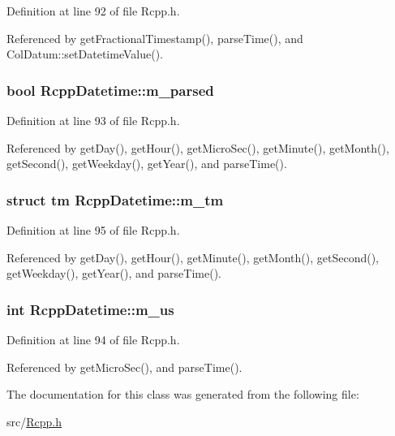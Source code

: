 Definition at line 92 of file Rcpp.h.

Referenced by getFractionalTimestamp(), parseTime(), and ColDatum::setDatetimeValue().\hypertarget{classRcppDatetime_515e3390c1834e58ce6bba39854638ad}{
\subsubsection[{m\_\-parsed}]{\setlength{\rightskip}{0pt plus 5cm}bool {\bf RcppDatetime::m\_\-parsed}}}
\label{classRcppDatetime_515e3390c1834e58ce6bba39854638ad}




Definition at line 93 of file Rcpp.h.

Referenced by getDay(), getHour(), getMicroSec(), getMinute(), getMonth(), getSecond(), getWeekday(), getYear(), and parseTime().\hypertarget{classRcppDatetime_3f65c708657270208656c1be885e9f1b}{
\subsubsection[{m\_\-tm}]{\setlength{\rightskip}{0pt plus 5cm}struct tm {\bf RcppDatetime::m\_\-tm}}}
\label{classRcppDatetime_3f65c708657270208656c1be885e9f1b}




Definition at line 95 of file Rcpp.h.

Referenced by getDay(), getHour(), getMinute(), getMonth(), getSecond(), getWeekday(), getYear(), and parseTime().\hypertarget{classRcppDatetime_68b9c7b759ffbba14aca3ae0680ea8a4}{
\subsubsection[{m\_\-us}]{\setlength{\rightskip}{0pt plus 5cm}int {\bf RcppDatetime::m\_\-us}}}
\label{classRcppDatetime_68b9c7b759ffbba14aca3ae0680ea8a4}




Definition at line 94 of file Rcpp.h.

Referenced by getMicroSec(), and parseTime().

The documentation for this class was generated from the following file:\begin{CompactItemize}
\item 
src/\hyperlink{Rcpp_8h}{Rcpp.h}\end{CompactItemize}
